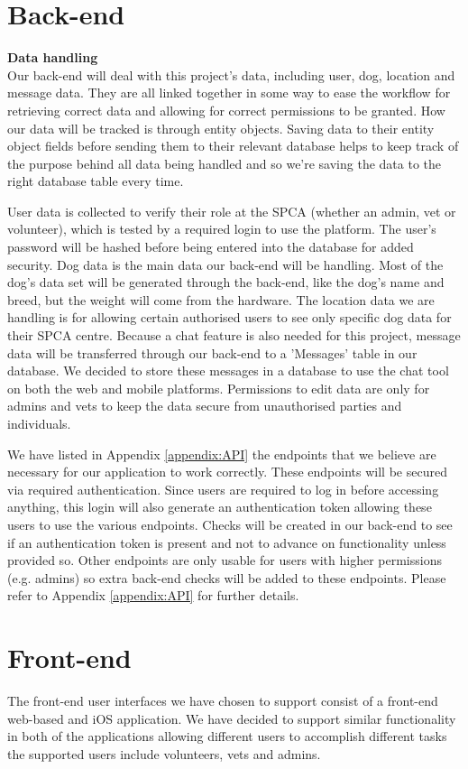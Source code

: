 \section{Back-end}

\textbf{Data handling}\\
Our back-end will deal with this project's data, including user, dog, location and message data. They are all linked together in some way to ease the workflow for retrieving correct data and allowing for correct permissions to be granted. How our data will be tracked is through entity objects. Saving data to their entity object fields before sending them to their relevant database helps to keep track of the purpose behind all data being handled and so we're saving the data to the right database table every time.

User data is collected to verify their role at the SPCA (whether an admin, vet or volunteer), which is tested by a required login to use the platform. The user's password will be hashed before being entered into the database for added security. Dog data is the main data our back-end will be handling. Most of the dog's data set will be generated through the back-end, like the dog's name and breed, but the weight will come from the hardware. The location data we are handling is for allowing certain authorised users to see only specific dog data for their SPCA centre. Because a chat feature is also needed for this project, message data will be transferred through our back-end to a 'Messages' table in our database. We decided to store these messages in a database to use the chat tool on both the web and mobile platforms. Permissions to edit data are only for admins and vets to keep the data secure from unauthorised parties and individuals.

We have listed in Appendix \ref{appendix:API} the endpoints that we believe are necessary for our application to work correctly. These endpoints will be secured via required authentication. Since users are required to log in before accessing anything, this login will also generate an authentication token allowing these users to use the various endpoints. Checks will be created in our back-end to see if an authentication token is present and not to advance on functionality unless provided so. Other endpoints are only usable for users with higher permissions (e.g. admins) so extra back-end checks will be added to these endpoints. Please refer to Appendix \ref{appendix:API} for further details.

\section{Front-end}
The front-end user interfaces we have chosen to support consist of a front-end web-based and iOS application. We have decided to support similar functionality in both of the applications allowing different users to accomplish different tasks the supported users include volunteers, vets and admins.

